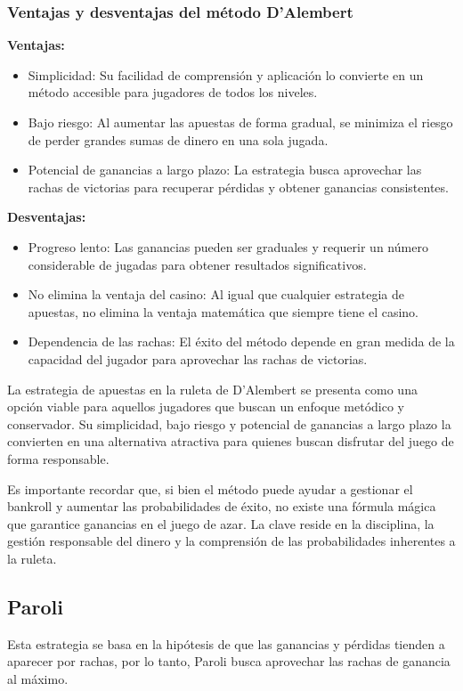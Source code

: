 \documentclass{article}
\begin{document}
\subsubsection{Ventajas y desventajas del método D'Alembert}

\textbf{Ventajas:}

\begin{itemize}
    \item Simplicidad: Su facilidad de comprensión y aplicación lo convierte en un método accesible para jugadores de todos los niveles.
    \item Bajo riesgo: Al aumentar las apuestas de forma gradual, se minimiza el riesgo de perder grandes sumas de dinero en una sola jugada.
    \item Potencial de ganancias a largo plazo: La estrategia busca aprovechar las rachas de victorias para recuperar pérdidas y obtener ganancias consistentes.
\end{itemize}

\textbf{Desventajas:}

\begin{itemize}
    \item Progreso lento: Las ganancias pueden ser graduales y requerir un número considerable de jugadas para obtener resultados significativos.
    \item No elimina la ventaja del casino: Al igual que cualquier estrategia de apuestas, no elimina la ventaja matemática que siempre tiene el casino.
    \item Dependencia de las rachas: El éxito del método depende en gran medida de la capacidad del jugador para aprovechar las rachas de victorias.
\end{itemize}

La estrategia de apuestas en la ruleta de D'Alembert se presenta como una opción viable para aquellos jugadores que buscan un enfoque metódico y conservador. Su simplicidad, bajo riesgo y potencial de ganancias a largo plazo la convierten en una alternativa atractiva para quienes buscan disfrutar del juego de forma responsable.

Es importante recordar que, si bien el método puede ayudar a gestionar el bankroll y aumentar las probabilidades de éxito, no existe una fórmula mágica que garantice ganancias en el juego de azar. La clave reside en la disciplina, la gestión responsable del dinero y la comprensión de las probabilidades inherentes a la ruleta.

\subsection{Paroli}
Esta estrategia se basa en la hipótesis de que las ganancias y pérdidas tienden a aparecer por rachas, por lo tanto, Paroli busca aprovechar las rachas de ganancia al máximo. 
\end{document}
